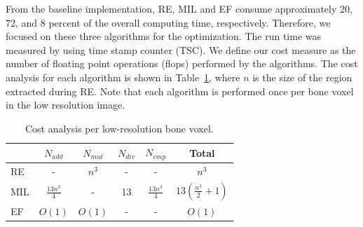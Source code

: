 \documentclass[letterpaper]{article}
\begin{document}

From the baseline implementation, RE, MIL and EF consume approximately 20, 72, and 8 percent of the overall computing time, respectively. Therefore, we focused on these three algorithms for the optimization. The run time was measured by using time stamp counter (TSC).  We define our cost measure as the number of floating point operations (flops) performed by the algorithms. The cost analysis for each algorithm is shown in Table~\ref{tab:cost}, where $n$ is the size of the region extracted during RE. Note that each algorithm is performed once per bone voxel in the low resolution image. 


\begin{table}[t]
    \caption{Cost analysis per low-resolution bone voxel.}
    \label{tab:cost}
    \begin{tabular}{l c c c c | c}
        \toprule
        & $N_{add}$ & $N_{mul}$ & $N_{div}$ & $N_{cmp}$ & Total\\
        \midrule
        RE & - & $n^{3}$ & - & - &   $n^{3}$\\
        MIL & $\frac{13n^{3}}{4}$ & -  & 13 & $\frac{13n^{3}}{4}$ &  $13(\frac{n^{3}}{2}+1)$\\
        EF & $O(1)$ & $O(1)$ & - & - & $O(1)$\\
        \bottomrule
    \end{tabular}
\end{table}
\end{document}
